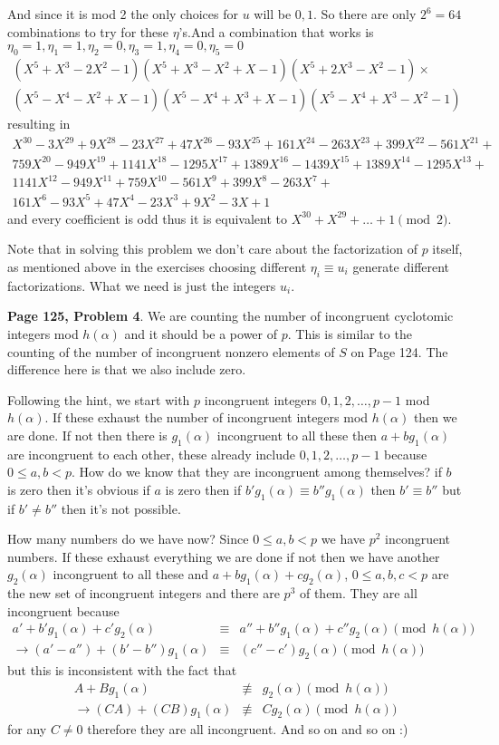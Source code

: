 \documentclass[aps,preprint,preprintnumbers,nofootinbib,showpacs,prd]{revtex4-1}
\newcommand{\nbea}{\begin{eqnarray*}}
\newcommand{\neea}{\end{eqnarray*}}
\begin{document}
And since it is mod 2 the only choices for $u$ will be $0,1$. So there are only $2^6 = 64$ combinations to try for these $\eta$'s.And a combination that works is $\eta_0 = 1, \eta_1 = 1, \eta_2 = 0, \eta_3 = 1, \eta_4 = 0, \eta_5 = 0$
%
\nbea
(X^5+X^3-2X^2-1)(X^5+X^3-X^2+X-1)(X^5+2X^3-X^2-1) \times \\
(X^5-X^4-X^2+X-1)(X^5-X^4+X^3+X-1)(X^5-X^4+X^3-X^2-1)
\neea
%
resulting in
%
\nbea
X^{30}-3X^{29}+9X^{28}-23X^{27}+47X^{26}-93X^{25}+161X^{24}-263X^{23}+399X^{22}-561X^{21}+\\
759X^{20}-949X^{19}+1141X^{18}-1295X^{17}+1389X^{16}-1439X^{15}+1389X^{14}-1295X^{13}+\\
1141X^{12}-949X^{11}+759X^{10}-561X^9+399X^8-263X^7+\\
161X^6-93X^5+47X^4-23X^3+9X^2-3X+1
\neea
%
and every coefficient is odd thus it is equivalent to $X^{30} + X^{29} + \dots + 1 \pmod{2}$.

Note that in solving this problem we don't care about the factorization of $p$ itself, as mentioned above in the exercises choosing different $\eta_i \equiv u_i$ generate different factorizations. What we need is just the integers $u_i$.

{\bf Page 125, Problem 4}. We are counting the number of incongruent cyclotomic integers mod $h(\alpha)$ and it should be a power of $p$. This is similar to the counting of the number of incongruent nonzero elements of $S$ on Page 124. The difference here is that we also include zero. 

Following the hint, we start with $p$ incongruent integers $0,1,2,\dots,p-1$ mod $h(\alpha)$. If these exhaust the number of incongruent integers mod $h(\alpha)$ then we are done. If not then there is $g_1(\alpha)$ incongruent to all these then $a + bg_1(\alpha)$ are incongruent to each other, these already include $0,1,2,\dots,p-1$ because $0 \le a, b < p$. How do we know that they are incongruent among themselves? if $b$ is zero then it's obvious if $a$ is zero then if $b'g_1(\alpha) \equiv b''g_1(\alpha)$ then $b' \equiv b''$ but if $b' \neq b''$ then it's not possible.

How many numbers do we have now? Since $0 \le a,b < p$ we have $p^2$ incongruent numbers. If these exhaust everything we are done if not then we have another $g_2(\alpha)$ incongruent to all these and $a + bg_1(\alpha) + cg_2(\alpha)$, $0 \le a,b,c <p$ are the new set of incongruent integers and there are $p^3$ of them. They are all incongruent because
%
\nbea
a' + b'g_1(\alpha) + c'g_2(\alpha) & \equiv & a'' + b''g_1(\alpha) + c''g_2(\alpha) \pmod{h(\alpha)} \\
\to (a' - a'') + (b' - b'')g_1(\alpha) & \equiv & (c'' - c') g_2(\alpha) \pmod{h(\alpha)}
\neea
%
but this is inconsistent with the fact that
%
\nbea
A + B g_1(\alpha) & \not\equiv & g_2(\alpha) \pmod{h(\alpha)} \\
\to (CA) + (CB) g_1(\alpha) &\not\equiv & C g_2(\alpha) \pmod{h(\alpha)} 
\neea
%
for any $C \neq 0$ therefore they are all incongruent. And so on and so on :)
\end{document}
